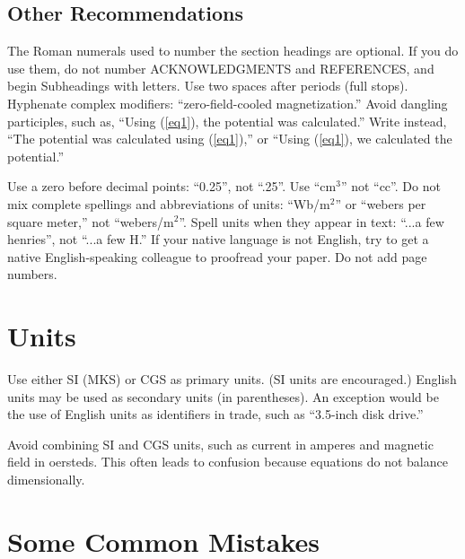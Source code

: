 \subsection{Other Recommendations}

The Roman numerals used to number the section headings are
optional. If you do use them, do not number ACKNOWLEDGMENTS and
REFERENCES, and begin Subheadings with letters. Use two spaces
after periods (full stops). Hyphenate complex modifiers:
``zero-field-cooled magnetization.'' Avoid dangling participles,
such as, ``Using (\ref{eq1}), the potential was calculated.''
Write instead, ``The potential was calculated using (\ref{eq1}),''
or ``Using  (\ref{eq1}), we calculated the potential.''

Use a zero before decimal points: ``0.25'', not ``.25''. Use ``cm$^{3}$''
not ``cc''. Do not mix complete spellings and abbreviations of units:
``Wb/m$^{2}$'' or ``webers per square meter,'' not ``webers/m$^{2}$''.
Spell units when they appear in text: ``...a few henries'', not ``...a few
H.'' If your native language is not English, try to get a native
English-speaking colleague to proofread your paper. Do not add page
numbers.

\section{Units}

Use either SI (MKS) or CGS as primary units. (SI units are encouraged.)
English units may be used as secondary units (in parentheses). An
exception would be the use of English units as identifiers in trade, such
as ``3.5-inch disk drive.''

Avoid combining SI and CGS units, such as current in amperes and magnetic
field in oersteds. This often leads to confusion because equations do not
balance dimensionally.


\section{Some Common Mistakes}

